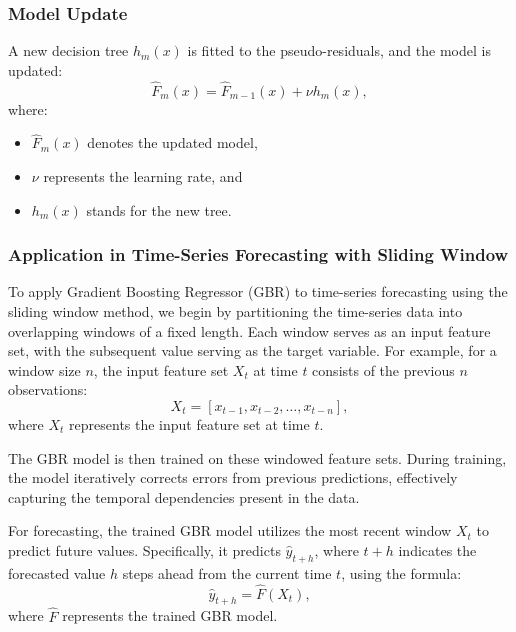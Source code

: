 \documentclass{ieeeojies}
\begin{document}
\subsubsection{Model Update}

A new decision tree \(h_m(x)\) is fitted to the pseudo-residuals, and the model is updated:
\begin{equation}
    \hat{F}_m(x) = \hat{F}_{m-1}(x) + \nu h_m(x),
\end{equation}
where:
\begin{itemize}
    \item \(\hat{F}_m(x)\) denotes the updated model,
    \item \(\nu\) represents the learning rate, and
    \item \(h_m(x)\) stands for the new tree.
\end{itemize}

\subsubsection{Application in Time-Series Forecasting with Sliding Window}

To apply Gradient Boosting Regressor (GBR) to time-series forecasting using the sliding window method, we begin by partitioning the time-series data into overlapping windows of a fixed length. Each window serves as an input feature set, with the subsequent value serving as the target variable. For example, for a window size \(n\), the input feature set \(X_t\) at time \(t\) consists of the previous \(n\) observations:
\begin{equation}
    X_t = [x_{t-1}, x_{t-2}, \ldots, x_{t-n}],
\end{equation}
where \(X_t\) represents the input feature set at time \(t\).

The GBR model is then trained on these windowed feature sets. During training, the model iteratively corrects errors from previous predictions, effectively capturing the temporal dependencies present in the data.

For forecasting, the trained GBR model utilizes the most recent window \(X_t\) to predict future values. Specifically, it predicts \(\hat{y}_{t+h}\), where \(t+h\) indicates the forecasted value \(h\) steps ahead from the current time \(t\), using the formula:
\begin{equation}
    \hat{y}_{t+h} = \hat{F}(X_t),
\end{equation}
where \(\hat{F}\) represents the trained GBR model.
\end{document}

